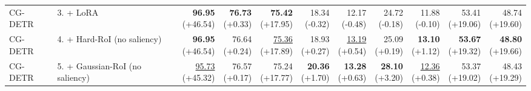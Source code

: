 \documentclass{article}
\begin{document}
{\begin{tabular}{llrrrrrrrrr}
CG-DETR & 3. + LoRA & \shortstack{\textbf{96.95} \\ {\scriptsize (+46.54)}} & \shortstack{\textbf{76.73} \\ {\scriptsize (+0.33)}} & \shortstack{\textbf{75.42} \\ {\scriptsize (+17.95)}} & \shortstack{18.34 \\ {\scriptsize (-0.32)}} & \shortstack{12.17 \\ {\scriptsize (-0.48)}} & \shortstack{24.72 \\ {\scriptsize (-0.18)}} & \shortstack{11.88 \\ {\scriptsize (-0.10)}} & \shortstack{53.41 \\ {\scriptsize (+19.06)}} & \shortstack{48.74 \\ {\scriptsize (+19.60)}} \\
CG-DETR & 4. + Hard-RoI (no saliency) & \shortstack{\textbf{96.95} \\ {\scriptsize (+46.54)}} & \shortstack{76.64 \\ {\scriptsize (+0.24)}} & \shortstack{\underline{75.36} \\ {\scriptsize (+17.89)}} & \shortstack{18.93 \\ {\scriptsize (+0.27)}} & \shortstack{\underline{13.19} \\ {\scriptsize (+0.54)}} & \shortstack{25.09 \\ {\scriptsize (+0.19)}} & \shortstack{\textbf{13.10} \\ {\scriptsize (+1.12)}} & \shortstack{\textbf{53.67} \\ {\scriptsize (+19.32)}} & \shortstack{\textbf{48.80} \\ {\scriptsize (+19.66)}} \\
CG-DETR & 5. + Gaussian-RoI (no saliency) & \shortstack{\underline{95.73} \\ {\scriptsize (+45.32)}} & \shortstack{76.57 \\ {\scriptsize (+0.17)}} & \shortstack{75.24 \\ {\scriptsize (+17.77)}} & \shortstack{\textbf{20.36} \\ {\scriptsize (+1.70)}} & \shortstack{\textbf{13.28} \\ {\scriptsize (+0.63)}} & \shortstack{\textbf{28.10} \\ {\scriptsize (+3.20)}} & \shortstack{\underline{12.36} \\ {\scriptsize (+0.38)}} & \shortstack{53.37 \\ {\scriptsize (+19.02)}} & \shortstack{48.43 \\ {\scriptsize (+19.29)}} \\

\end{tabular}}
\end{document}
